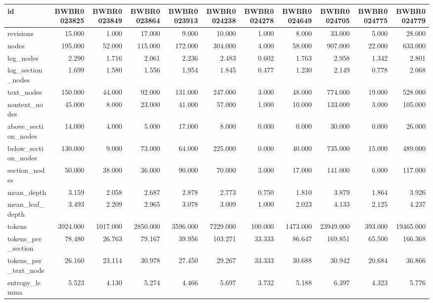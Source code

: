 \begin{tabular}{lrrrrrrrrrr}
\toprule
id & BWBR0023825 & BWBR0023849 & BWBR0023864 & BWBR0023913 & BWBR0024238 & BWBR0024278 & BWBR0024649 & BWBR0024705 & BWBR0024775 & BWBR0024779 \\
\midrule
revisions & 15.000 & 1.000 & 17.000 & 9.000 & 10.000 & 1.000 & 8.000 & 33.000 & 5.000 & 28.000 \\
\cline{1-11}
nodes & 195.000 & 52.000 & 115.000 & 172.000 & 304.000 & 4.000 & 58.000 & 907.000 & 22.000 & 633.000 \\
\cline{1-11}
log\_nodes & 2.290 & 1.716 & 2.061 & 2.236 & 2.483 & 0.602 & 1.763 & 2.958 & 1.342 & 2.801 \\
\cline{1-11}
log\_section\_nodes & 1.699 & 1.580 & 1.556 & 1.954 & 1.845 & 0.477 & 1.230 & 2.149 & 0.778 & 2.068 \\
\cline{1-11}
text\_nodes & 150.000 & 44.000 & 92.000 & 131.000 & 247.000 & 3.000 & 48.000 & 774.000 & 19.000 & 528.000 \\
\cline{1-11}
nontext\_nodes & 45.000 & 8.000 & 23.000 & 41.000 & 57.000 & 1.000 & 10.000 & 133.000 & 3.000 & 105.000 \\
\cline{1-11}
above\_section\_nodes & 14.000 & 4.000 & 5.000 & 17.000 & 8.000 & 0.000 & 0.000 & 30.000 & 0.000 & 26.000 \\
\cline{1-11}
below\_section\_nodes & 130.000 & 9.000 & 73.000 & 64.000 & 225.000 & 0.000 & 40.000 & 735.000 & 15.000 & 489.000 \\
\cline{1-11}
section\_nodes & 50.000 & 38.000 & 36.000 & 90.000 & 70.000 & 3.000 & 17.000 & 141.000 & 6.000 & 117.000 \\
\cline{1-11}
mean\_depth & 3.159 & 2.058 & 2.687 & 2.878 & 2.773 & 0.750 & 1.810 & 3.879 & 1.864 & 3.926 \\
\cline{1-11}
mean\_leaf\_depth & 3.493 & 2.209 & 2.965 & 3.078 & 3.009 & 1.000 & 2.023 & 4.133 & 2.125 & 4.237 \\
\cline{1-11}
tokens & 3924.000 & 1017.000 & 2850.000 & 3596.000 & 7229.000 & 100.000 & 1473.000 & 23949.000 & 393.000 & 19465.000 \\
\cline{1-11}
tokens\_per\_section & 78.480 & 26.763 & 79.167 & 39.956 & 103.271 & 33.333 & 86.647 & 169.851 & 65.500 & 166.368 \\
\cline{1-11}
tokens\_per\_text\_node & 26.160 & 23.114 & 30.978 & 27.450 & 29.267 & 33.333 & 30.688 & 30.942 & 20.684 & 36.866 \\
\cline{1-11}
entropy\_lemma & 5.523 & 4.130 & 5.274 & 4.466 & 5.697 & 3.732 & 5.188 & 6.397 & 4.323 & 5.776 \\

\end{tabular}
